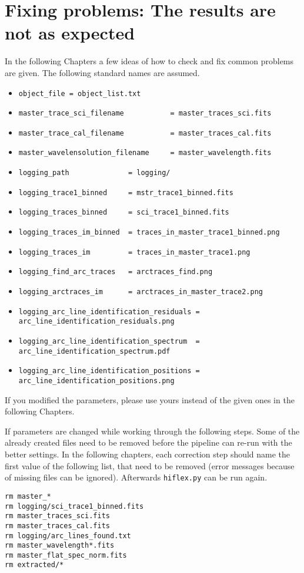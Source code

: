 \documentclass[10pt,a4paper]{article}
\begin{document}
\section{Fixing problems: The results are not as expected}
\label{Section:Problem_solution}
In the following Chapters a few ideas of how to check and fix common problems are given. The following standard names are assumed.
\begin{itemize}\small\setlength\itemsep{-0.2cm}
  \item \verb|object_file = object_list.txt|
  \item \verb|master_trace_sci_filename           = master_traces_sci.fits|
  \item \verb|master_trace_cal_filename           = master_traces_cal.fits|
  \item \verb|master_wavelensolution_filename     = master_wavelength.fits|
  \item \verb|logging_path              = logging/|
  \item \verb|logging_trace1_binned     = mstr_trace1_binned.fits|
  \item \verb|logging_traces_binned     = sci_trace1_binned.fits|
  \item \verb|logging_traces_im_binned  = traces_in_master_trace1_binned.png|
  \item \verb|logging_traces_im         = traces_in_master_trace1.png|
  \item \verb|logging_find_arc_traces   = arctraces_find.png|
  \item \verb|logging_arctraces_im      = arctraces_in_master_trace2.png|
  \item \verb|logging_arc_line_identification_residuals = arc_line_identification_residuals.png|
  \item \verb|logging_arc_line_identification_spectrum  = arc_line_identification_spectrum.pdf|
  \item \verb|logging_arc_line_identification_positions = arc_line_identification_positions.png|
\end{itemize}
If you modified the parameters, please use yours instead of the given ones in the following Chapters.

If parameters are changed while working through the following steps. Some of the already created files need to be removed before the pipeline can re-run with the better settings. In the following chapters, each correction step should name the first value of the following list, that need to be removed (error messages because of missing files can be ignored). Afterwards \verb|hiflex.py| can be run again.
\begin{lstlisting}[style=base]
rm master_*
rm logging/sci_trace1_binned.fits
rm master_traces_sci.fits
rm master_traces_cal.fits
rm logging/arc_lines_found.txt
rm master_wavelength*.fits 
rm master_flat_spec_norm.fits
rm extracted/*
\end{lstlisting}
\end{document}
